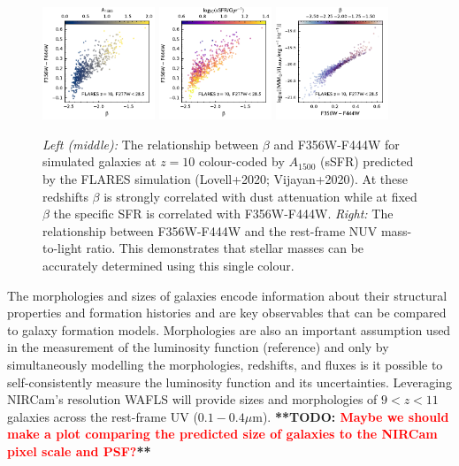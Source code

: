 \documentclass[12pt]{article}
\newcommand{\todo}[1]{\textbf{**TODO: \textcolor{red}{#1}**}}
\begin{document}
\begin{figure}[h!]
    \centering
    \includegraphics[width=0.3\textwidth]{figs/beta_A1500.pdf}
    \includegraphics[width=0.3\textwidth]{figs/beta_sSFR.pdf}
    \includegraphics[width=0.3\textwidth]{figs/C_beta_MTOL.pdf}
    \caption{\emph{Left (middle):} The relationship between $\beta$ and F356W-F444W for simulated galaxies at $z=10$ colour-coded by $A_{1500}$ (sSFR) predicted by the FLARES simulation (Lovell+2020; Vijayan+2020). At these redshifts $\beta$ is strongly correlated with dust attenuation while at fixed $\beta$ the specific SFR is correlated with F356W-F444W. \emph{Right:} The relationship between F356W-F444W and the rest-frame NUV mass-to-light ratio. This demonstrates that stellar masses can be accurately determined using this single colour.}
    \label{fig:beta}
\end{figure}



The morphologies and sizes of galaxies encode information about their structural properties and formation histories and are key observables that can be compared to galaxy formation models. Morphologies are also an important assumption used in the measurement of the luminosity function (reference) and only by simultaneously modelling the morphologies, redshifts, and fluxes is it possible to self-consistently measure the luminosity function and its uncertainties. Leveraging NIRCam's resolution WAFLS will provide sizes and morphologies of $9<z<11$ galaxies across the rest-frame UV ($0.1-0.4\mu$m). \todo{Maybe we should make a plot comparing the predicted size of galaxies to the NIRCam pixel scale and PSF?}
\end{document}
